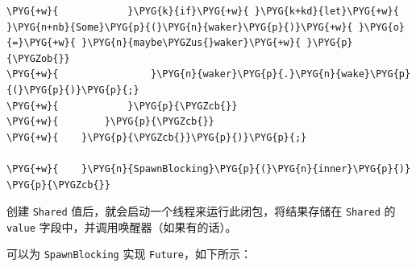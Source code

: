 \begin{Verbatim}[commandchars=\\\{\},breaklines=true,breakanywhere=true,fontsize=\codefont,xleftmargin=17bp]
\PYG{+w}{            }\PYG{k}{if}\PYG{+w}{ }\PYG{k+kd}{let}\PYG{+w}{ }\PYG{n+nb}{Some}\PYG{p}{(}\PYG{n}{waker}\PYG{p}{)}\PYG{+w}{ }\PYG{o}{=}\PYG{+w}{ }\PYG{n}{maybe\PYGZus{}waker}\PYG{+w}{ }\PYG{p}{\PYGZob{}}
\PYG{+w}{                }\PYG{n}{waker}\PYG{p}{.}\PYG{n}{wake}\PYG{p}{(}\PYG{p}{)}\PYG{p}{;}
\PYG{+w}{            }\PYG{p}{\PYGZcb{}}
\PYG{+w}{        }\PYG{p}{\PYGZcb{}}
\PYG{+w}{    }\PYG{p}{\PYGZcb{}}\PYG{p}{)}\PYG{p}{;}

\PYG{+w}{    }\PYG{n}{SpawnBlocking}\PYG{p}{(}\PYG{n}{inner}\PYG{p}{)}
\PYG{p}{\PYGZcb{}}
\end{Verbatim}

创建 \texttt{Shared} 值后，就会启动一个线程来运行此闭包，将结果存储在 \texttt{Shared} 的 \texttt{value} 字段中，并调用唤醒器（如果有的话）。

可以为 \texttt{SpawnBlocking} 实现 \texttt{Future}，如下所示：

